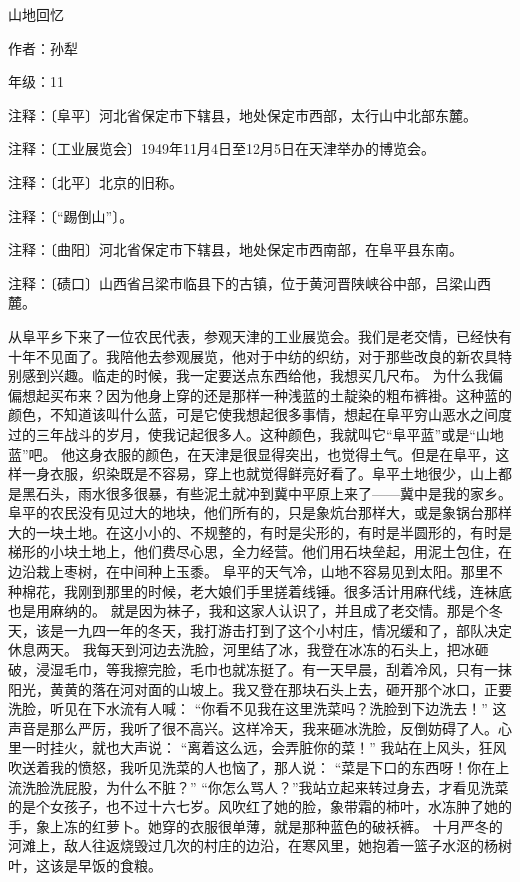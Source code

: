 山地回忆
 
作者：孙犁

年级：11

注释：〔阜平〕河北省保定市下辖县，地处保定市西部，太行山中北部东麓。

注释：〔工业展览会〕1949年11月4日至12月5日在天津举办的博览会。

注释：〔北平〕北京的旧称。

注释：〔“踢倒山”〕。

注释：〔曲阳〕河北省保定市下辖县，地处保定市西南部，在阜平县东南。

注释：〔碛口〕山西省吕梁市临县下的古镇，位于黄河晋陕峡谷中部，吕梁山西麓。

从阜平乡下来了一位农民代表，参观天津的工业展览会。我们是老交情，已经快有十年不见面了。我陪他去参观展览，他对于中纺的织纺，对于那些改良的新农具特别感到兴趣。临走的时候，我一定要送点东西给他，我想买几尺布。 
为什么我偏偏想起买布来？因为他身上穿的还是那样一种浅蓝的土靛染的粗布裤褂。这种蓝的颜色，不知道该叫什么蓝，可是它使我想起很多事情，想起在阜平穷山恶水之间度过的三年战斗的岁月，使我记起很多人。这种颜色，我就叫它“阜平蓝”或是“山地蓝”吧。 
他这身衣服的颜色，在天津是很显得突出，也觉得土气。但是在阜平，这样一身衣服，织染既是不容易，穿上也就觉得鲜亮好看了。阜平土地很少，山上都是黑石头，雨水很多很暴，有些泥土就冲到冀中平原上来了——冀中是我的家乡。阜平的农民没有见过大的地块，他们所有的，只是象炕台那样大，或是象锅台那样大的一块土地。在这小小的、不规整的，有时是尖形的，有时是半圆形的，有时是梯形的小块土地上，他们费尽心思，全力经营。他们用石块垒起，用泥土包住，在边沿栽上枣树，在中间种上玉黍。 
阜平的天气冷，山地不容易见到太阳。那里不种棉花，我刚到那里的时候，老大娘们手里搓着线锤。很多活计用麻代线，连袜底也是用麻纳的。 
就是因为袜子，我和这家人认识了，并且成了老交情。那是个冬天，该是一九四一年的冬天，我打游击打到了这个小村庄，情况缓和了，部队决定休息两天。 
我每天到河边去洗脸，河里结了冰，我登在冰冻的石头上，把冰砸破，浸湿毛巾，等我擦完脸，毛巾也就冻挺了。有一天早晨，刮着冷风，只有一抹阳光，黄黄的落在河对面的山坡上。我又登在那块石头上去，砸开那个冰口，正要洗脸，听见在下水流有人喊： 
“你看不见我在这里洗菜吗？洗脸到下边洗去！” 
这声音是那么严厉，我听了很不高兴。这样冷天，我来砸冰洗脸，反倒妨碍了人。心里一时挂火，就也大声说： 
“离着这么远，会弄脏你的菜！” 
我站在上风头，狂风吹送着我的愤怒，我听见洗菜的人也恼了，那人说： 
“菜是下口的东西呀！你在上流洗脸洗屁股，为什么不脏？” 
“你怎么骂人？”我站立起来转过身去，才看见洗菜的是个女孩子，也不过十六七岁。风吹红了她的脸，象带霜的柿叶，水冻肿了她的手，象上冻的红萝卜。她穿的衣服很单薄，就是那种蓝色的破袄裤。 
十月严冬的河滩上，敌人往返烧毁过几次的村庄的边沿，在寒风里，她抱着一篮子水沤的杨树叶，这该是早饭的食粮。 
